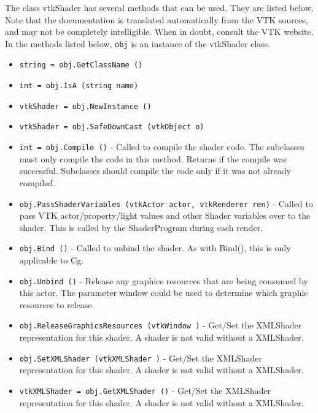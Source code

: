 The class vtkShader has several methods that can be used.
  They are listed below.
Note that the documentation is translated automatically from the VTK sources,
and may not be completely intelligible.  When in doubt, consult the VTK website.
In the methods listed below, \verb|obj| is an instance of the vtkShader class.
\begin{itemize}
\item  \verb|string = obj.GetClassName ()|

\item  \verb|int = obj.IsA (string name)|

\item  \verb|vtkShader = obj.NewInstance ()|

\item  \verb|vtkShader = obj.SafeDownCast (vtkObject o)|

\item  \verb|int = obj.Compile ()| -  Called to compile the shader code.
 The subclasses must only compile the code in this method.
 Returns if the compile was successful.
 Subclasses should compile the code only if it was not
 already compiled.

\item  \verb|obj.PassShaderVariables (vtkActor actor, vtkRenderer ren)| -  Called to pass VTK actor/property/light values and other
 Shader variables over to the shader. This is called by the ShaderProgram
 during each render.

\item  \verb|obj.Bind ()| -  Called to unbind the shader. As with Bind(), this is only applicable
 to Cg.

\item  \verb|obj.Unbind ()| -  Release any graphics resources that are being consumed by this actor.
 The parameter window could be used to determine which graphic
 resources to release.

\item  \verb|obj.ReleaseGraphicsResources (vtkWindow )| -  Get/Set the XMLShader representation for this shader.
 A shader is not valid without a XMLShader.

\item  \verb|obj.SetXMLShader (vtkXMLShader )| -  Get/Set the XMLShader representation for this shader.
 A shader is not valid without a XMLShader.

\item  \verb|vtkXMLShader = obj.GetXMLShader ()| -  Get/Set the XMLShader representation for this shader.
 A shader is not valid without a XMLShader.


\end{itemize}
